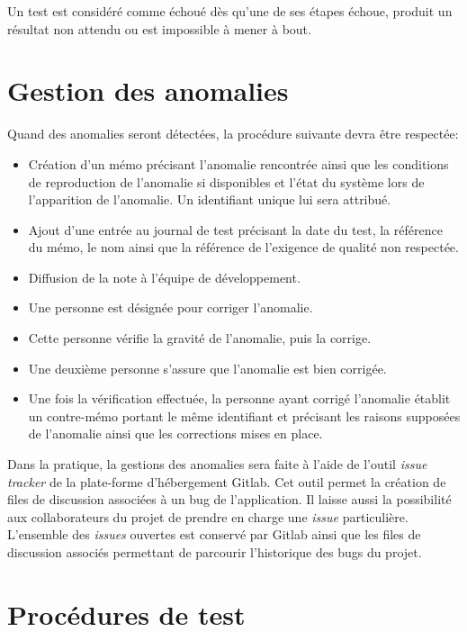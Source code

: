\documentclass{../res/univ-projet}
\begin{document}
Un test est considéré comme échoué dès qu'une de ses étapes échoue, produit un résultat non attendu ou est impossible à mener à bout.


\section{Gestion des anomalies}

Quand des anomalies seront détectées, la procédure suivante devra être respectée:
  \begin{itemize}
   \item Création d'un mémo précisant l'anomalie rencontrée ainsi que les conditions de reproduction de l'anomalie si disponibles et l'état du système lors de l'apparition de l'anomalie.  
   Un identifiant unique lui sera attribué.
   \item Ajout d'une entrée au journal de test précisant la date du test, la référence du mémo, le nom ainsi que la référence de l'exigence de 
   qualité non respectée.
   \item Diffusion de la note à l'équipe de développement.
   \item Une personne est désignée pour corriger l'anomalie.
   \item Cette personne vérifie la gravité de l'anomalie, puis la corrige.
   \item Une deuxième personne s'assure que l'anomalie est bien corrigée.
   \item Une fois la vérification effectuée, la personne ayant corrigé l'anomalie établit un contre-mémo portant le même identifiant et précisant les raisons supposées 
   de l'anomalie ainsi que les corrections mises en place.
  \end{itemize}
  

  Dans la pratique, la gestions des anomalies sera faite à l'aide de l'outil \emph{issue tracker} de
  la plate-forme d'hébergement Gitlab. Cet outil permet la création de files de discussion associées à un bug
  de l'application. Il laisse aussi la possibilité aux collaborateurs du projet de prendre en charge 
  une \emph{issue} particulière. L'ensemble des \emph{issues} ouvertes est conservé par Gitlab ainsi
  que les files de discussion associés permettant de parcourir l'historique des bugs du projet.


\section{Procédures de test}
\end{document}
